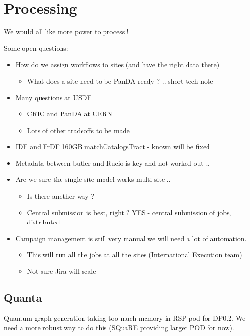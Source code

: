 \section{Processing}

We would all like more power to process !

Some open questions:

\begin{itemize}
\item How do we assign workflows to sites (and have the right data there)
\begin{itemize}
\item What does a site need to be PanDA ready ? .. short tech note
\end{itemize}

\item Many questions at USDF
\begin{itemize}
\item CRIC and PanDA at CERN
\item Lots of other tradeoffs to be made
\end{itemize}
\item IDF and FrDF  160GB matchCatalogsTract - known will be fixed
\item Metadata between butler and Rucio is key and not worked out ..
\item Are we sure the single site model works multi site ..
\begin{itemize}
\item Is there another way ?
\item Central submission is best, right ? YES - central submission of jobs, distributed
\end{itemize}
\item Campaign management is still very manual we will need a lot of automation.
\begin{itemize}
\item This will run all the jobs at all the sites (International Execution team)
\item Not sure Jira will scale
\end{itemize}
\end{itemize}

\subsection{Quanta}
Quantum graph generation taking too much memory in RSP pod for DP0.2.
We need a more robust way to do this (SQuaRE providing larger POD for now).

